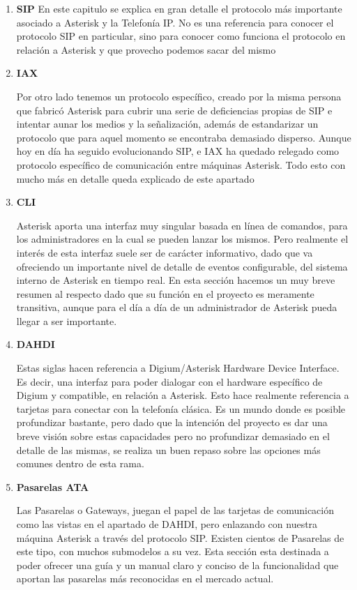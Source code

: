 \begin{enumerate}
	  \setlength{\itemsep}{10pt}

	\item \textbf{SIP}
	En este capitulo se explica en gran detalle el protocolo más importante asociado a Asterisk y la Telefonía IP. No es una referencia para conocer el protocolo SIP en particular, sino para conocer como funciona el protocolo en relación a Asterisk y que provecho podemos sacar del mismo
	
	\item \textbf{IAX}
	
	Por otro lado tenemos un protocolo específico, creado por la misma persona que fabricó Asterisk para cubrir una serie de deficiencias propias de SIP e intentar aunar los medios y la señalización, además de estandarizar un protocolo que para aquel momento se encontraba demasiado disperso. Aunque hoy en día ha seguido evolucionando SIP, e IAX ha quedado relegado como protocolo específico de comunicación entre máquinas Asterisk. Todo esto con mucho más en detalle queda explicado de este apartado
	
	\item \textbf{CLI}
	
	Asterisk aporta una interfaz muy singular basada en línea de comandos, para los administradores en la cual se pueden lanzar los mismos. Pero realmente el interés de esta interfaz suele ser de carácter informativo, dado que va ofreciendo un importante nivel de detalle de eventos configurable, del sistema interno de Asterisk en tiempo real. En esta sección hacemos un muy breve resumen al respecto dado que su función en el proyecto es meramente transitiva, aunque para el día a día de un administrador de Asterisk pueda llegar a ser importante.
	
	\item \textbf{DAHDI}
	
	Estas siglas hacen referencia a Digium/Asterisk Hardware Device Interface. Es decir, una interfaz para poder dialogar con el hardware específico de Digium y compatible, en relación a Asterisk. Esto hace realmente referencia a tarjetas para conectar con la telefonía clásica. Es un mundo donde es posible profundizar bastante, pero dado que la intención del proyecto es dar una breve visión sobre estas capacidades pero no profundizar demasiado en el detalle de las mismas, se realiza un buen repaso sobre las opciones más comunes dentro de esta rama.
	
  \item \textbf{Pasarelas ATA}
	
	Las Pasarelas o Gateways, juegan el papel de las tarjetas de comunicación como las vistas en el apartado de DAHDI, pero enlazando con nuestra máquina Asterisk a través del protocolo SIP. Existen cientos de Pasarelas de este tipo, con muchos submodelos a su vez. Esta sección esta destinada a poder ofrecer una guía y un manual claro y conciso de la funcionalidad que aportan las pasarelas más reconocidas en el mercado actual.
	
\end{enumerate}

